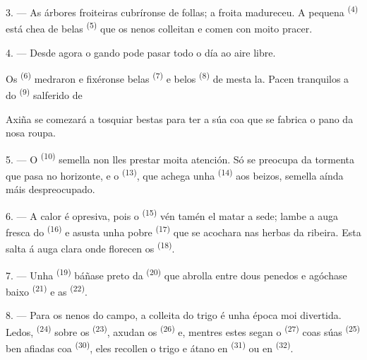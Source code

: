 3. --- As árbores froiteiras cubríronse de follas; a froita madureceu. A pequena
 \textsuperscript{(4)} está chea de belas 
\textsuperscript{(5)} que os nenos colleitan e comen con moito pracer.

4. --- Desde agora o gando pode pasar todo o día ao aire libre.

Os  \textsuperscript{(6)} medraron e fixéronse belas 
\textsuperscript{(7)} e belos  \textsuperscript{(8)} de mesta la. Pacen
tranquilos a  do  \textsuperscript{(9)} salferido de

Axiña se comezará a tosquiar  bestas para ter a súa  coa que se
fabrica o pano da nosa roupa.

\VUsaut{5.0mm}
\VUsaut{3.4mm}

5. --- O  \textsuperscript{(10)} semella non lles prestar moita atención. Só se
preocupa da tormenta que pasa no horizonte, e o 
\textsuperscript{(13)}, que achega unha  \textsuperscript{(14)} aos
beizos, semella aínda máis despreocupado.

6. --- A calor é opresiva, pois o  \textsuperscript{(15)} vén tamén el matar a
sede; lambe a auga fresca do  \textsuperscript{(16)} e asusta unha pobre
 \textsuperscript{(17)} que se acochara nas herbas da ribeira. Esta salta á auga
clara onde florecen os  \textsuperscript{(18)}.

7. --- Unha  \textsuperscript{(19)} báñase preto da
 \textsuperscript{(20)} que abrolla entre dous penedos e agóchase
baixo  \textsuperscript{(21)} e as
 \textsuperscript{(22)}.

\VUsaut{5.0mm}
\VUsaut{3.4mm}

8. --- Para os nenos do campo, a colleita do trigo é unha época moi divertida. Ledos,
 \textsuperscript{(24)} sobre os 
\textsuperscript{(23)}, axudan os  \textsuperscript{(26)} e, mentres estes
segan o  \textsuperscript{(27)} coas súas 
\textsuperscript{(25)} ben afiadas coa  \textsuperscript{(30)}, eles
recollen o trigo e átano en  \textsuperscript{(31)} ou en
 \textsuperscript{(32)}.

